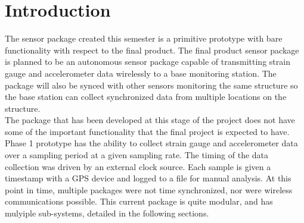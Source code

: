 \section{Introduction}
The sensor package created this semester is a primitive prototype with
bare functionality with respect to the final product. The final
product sensor package is planned to be an autonomous sensor package
capable of transmitting strain gauge and accelerometer data
wirelessly to a base monitoring station. The package will also
be synced with other sensors monitoring the same structure so the
base station can collect synchronized data from multiple locations
on the structure. \\

The package that has been developed at this stage of the project does
not have some of the important functionality that the final project
is expected to have. Phase 1 prototype has the ability to
collect strain gauge and accelerometer data over a sampling
period at a given sampling rate. The timing of the data
collection was driven by an external clock source. Each sample
is given a timestamp with a GPS device and logged to a file
for manual analysis. At this point in time, multiple packages
were not time synchronized, nor were wireless communications
possible. This current package is quite modular, and has
mulyiple sub-systems, detailed in the following
sections.
